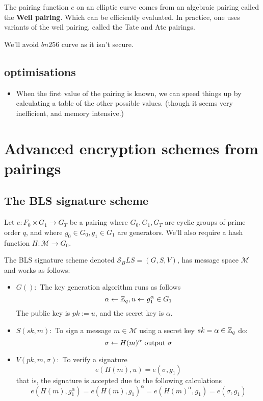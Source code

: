 \begin{rem}
  The pairing function $e$ on an elliptic curve comes from an algebraic pairing called the \textbf{Weil pairing}.
  Which can be efficiently evaluated. In practice, one uses variants of the weil 
  pairing, called the Tate and Ate pairings.
\end{rem}

We'll avoid $bn256$ curve as it isn't secure.


\subsection*{optimisations}
\begin{itemize}
  \item When the first value of the pairing is known, we can speed things up
  by calculating a table of the other possible values. (though it seems very inefficient, and memory intensive.)
\end{itemize}

\section{Advanced encryption schemes from pairings}

\subsection{The BLS signature scheme}
Let $e:F_0 \times G_1 \to G_T$ be a pairing where $G_0,G_1,G_T$ are
cyclic groups of prime order $q$, and where $g_0\in G_0, g_1\in G_1$ are
generators. 
We'll also require a hash function $H : \mathcal{M} \to G_0$.

The BLS signature scheme denoted $\mathcal{S}_BLS = (G,S,V)$, has message space
$\mathcal{M}$ and works as follows:
\begin{itemize}
  \item $G():$ The key generation algorithm runs as follows 
  $$  \alpha \leftarrow \mathbb{Z}_q,u\leftarrow g_1^\alpha \in G_1  $$
  The public key is $ pk := u$, and the secret key is $\alpha$.

  \item $S(sk,m):$ To sign a message $m\in \mathcal{M}$ using a secret key
  $sk=\alpha\in\mathbb{Z}_q$ do:
  $$ \sigma\leftarrow H(m)^{\alpha} \text{ output } \sigma$$

  \item $V(pk,m,\sigma):$ To verify a signature 
  $$ e(H(m), u) = e(\sigma,g_1) $$
  that is, the signature is accepted due to the following calculations
  $$e(H(m), g_1^\alpha) = e(H(m),g_1)^\alpha = e(H(m)^\alpha,g_1)= 
  e(\sigma, g_1)
  $$
\end{itemize}


